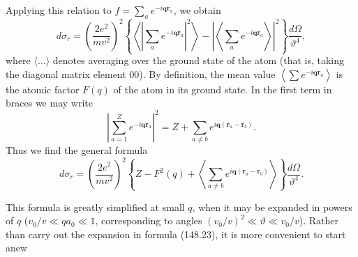 Applying this relation to $f=\sum_a e^{-i\mathbf q\mathbf r_a}$, we obtain
\begin{equation}
 d\sigma_r=\left(\frac{2e^2}{mv^2}\right)^2
 \left\{\left\langle\left|\sum_a e^{-i\mathbf q\mathbf r_a}\right|^2\right\rangle
 -\left|\left\langle\sum_a e^{-i\mathbf q\mathbf r_a}\right\rangle\right|^2\right\}
 \frac{d\Omega}{\vartheta^4},
 \tag{148.22}
\end{equation}
where $\langle\ldots\rangle$ denotes averaging over the ground state of the
atom (that is, taking the diagonal matrix element 00). By definition, the mean
value $\left\langle\sum e^{-i\mathbf q\mathbf r_a}\right\rangle$ is the atomic
factor $F(q)$ of the atom in its ground state. In the first term in braces we
may write
\[
 \left|\sum_{a=1}^Z e^{-i\mathbf q\mathbf r_a}\right|^2
 =Z+\sum_{a\ne b}e^{i\mathbf q(\mathbf r_a-\mathbf r_b)}.
\]
Thus we find the general formula
\begin{equation}
 d\sigma_r=\left(\frac{2e^2}{mv^2}\right)^2
 \left\{Z-F^2(q)+\left\langle\sum_{a\ne b}e^{i\mathbf q(\mathbf r_a-\mathbf r_b)}\right\rangle\right\}
 \frac{d\Omega}{\vartheta^4}.
 \tag{148.23}
\end{equation}

This formula is greatly simplified at small $q$, when it may be expanded in
powers of $q$ ($v_0/v\ll qa_0\ll1$, corresponding to angles
$(v_0/v)^2\ll\vartheta\ll v_0/v$). Rather than carry out the expansion in
formula (148.23), it is more convenient to start anew
